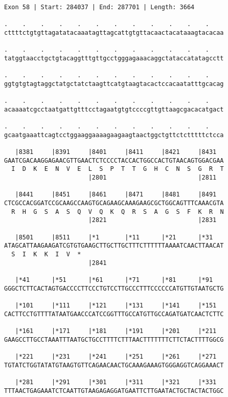 \documentclass{article}
\begin{document}
\newpage
\begin{Verbatim}
Exon 58 | Start: 284037 | End: 287701 | Length: 3664
 
.    .    .    .    .    .    .    .    .    .    .    .    
cttttctgtgttagatatacaaatagttagcattgtgttacaactacataaagtacacaa
  
.    .    .    .    .    .    .    .    .    .    .    .    
tatggtaacctgctgtacaggtttgttgcctgggagaaacaggctataccatatagcctt
  
.    .    .    .    .    .    .    .    .    .    .    .    
ggtgtgtagtaggctatgctatctaagttcatgtaagtacactccacaatatttgcacag
  
.    .    .    .    .    .    .    .    .    .    .    .    
acaaaatcgcctaatgattgtttcctagaatgtgtccccgttgttaagcgacacatgact
  
.    .    .    .    .    .    .    .    .    .    .    .    
gcaatgaaattcagtcctggaaggaaaagaagaagtaactggctgttctctttttctcca
  
   |8381     |8391     |8401     |8411     |8421     |8431  
GAATCGACAAGGAGAACGTTGAACTCTCCCCTACCACTGGCCACTGTAACAGTGGACGAA
  I  D  K  E  N  V  E  L  S  P  T  T  G  H  C  N  S  G  R  T
                       |2801                         |2811  
  
   |8441     |8451     |8461     |8471     |8481     |8491  
CTCGCCACGGATCCGCAAGCCAAGTGCAGAAGCAAAGAAGCGCTGGCAGTTTCAAACGTA
  R  H  G  S  A  S  Q  V  Q  K  Q  R  S  A  G  S  F  K  R  N
                       |2821                         |2831  
  
   |8501     |8511     |*1       |*11      |*21      |*31   
ATAGCATTAAGAAGATCGTGTGAAGCTTGCTTGCTTTCTTTTTTAAAATCAACTTAACAT
  S  I  K  K  I  V  *   
                       |2841                                
  
   |*41      |*51      |*61      |*71      |*81      |*91   
GGGCTCTTCACTAGTGACCCCTTCCCTGTCCTTGCCCTTTCCCCCCATGTTGTAATGCTG
  
   |*101     |*111     |*121     |*131     |*141     |*151  
CACTTCCTGTTTTATAATGAACCCATCCGGTTTGCCATGTTGCCAGATGATCAACTCTTC
  
   |*161     |*171     |*181     |*191     |*201     |*211  
GAAGCCTTGCCTAAATTTAATGCTGCCTTTTCTTTAACTTTTTTTCTTCTACTTTTGGCG
  
   |*221     |*231     |*241     |*251     |*261     |*271  
TGTATCTGGTATATGTAAGTGTTCAGAACAACTGCAAAGAAAGTGGGAGGTCAGGAAACT
  
   |*281     |*291     |*301     |*311     |*321     |*331  
TTTAACTGAGAAATCTCAATTGTAAGAGAGGATGAATTCTTGAATACTGCTACTACTGGC
  

\end{Verbatim}
\end{document}
